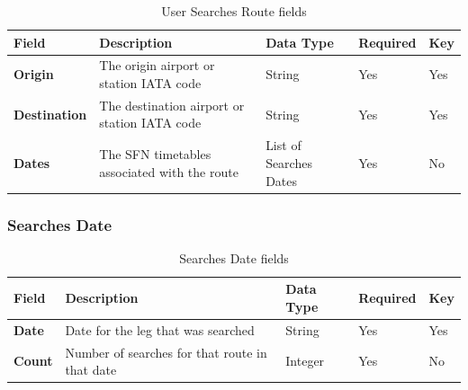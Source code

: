 \begin{table}[H]
\centering
\begin{tabular}{|>{\raggedright\arraybackslash}p{2.5cm}|>{\raggedright\arraybackslash}p{4cm}|>{\raggedright\arraybackslash}p{2.5cm}|>{\raggedright\arraybackslash}p{2cm}|>{\raggedright\arraybackslash}p{1.2cm}|}
\hline
\textbf{Field}       & \textbf{Description}                         & \textbf{Data Type}     & \textbf{Required} & \textbf{Key} \\ \hline
\textbf{Origin}      & The origin airport or station IATA code      & String                 & Yes               & Yes          \\ \hline
\textbf{Destination} & The destination airport or station IATA code & String                 & Yes               & Yes          \\ \hline
\textbf{Dates}       & The SFN timetables associated with the route & List of Searches Dates & Yes               & No           \\ \hline
\end{tabular}
\caption{User Searches Route fields}
\end{table}

\subsubsection{Searches Date}

\begin{table}[H]
\centering
\begin{tabular}{|>{\raggedright\arraybackslash}p{2.5cm}|>{\raggedright\arraybackslash}p{4cm}|>{\raggedright\arraybackslash}p{2.5cm}|>{\raggedright\arraybackslash}p{2cm}|>{\raggedright\arraybackslash}p{1.2cm}|}
\hline
\textbf{Field} & \textbf{Description}                           & \textbf{Data Type} & \textbf{Required} & \textbf{Key} \\ \hline
\textbf{Date}  & Date for the leg that was searched             & String             & Yes               & Yes          \\ \hline
\textbf{Count} & Number of searches for that route in that date & Integer            & Yes               & No           \\ \hline
\end{tabular}
\caption{Searches Date fields}
\end{table}







